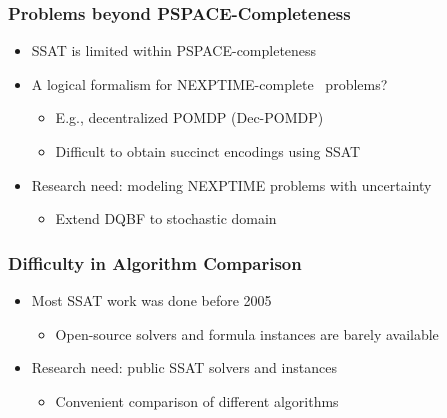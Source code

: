 \begin{frame}
      \frametitle{Problems beyond PSPACE-Completeness}
      \begin{itemize}
            \item SSAT is limited within PSPACE-completeness
                  \pause
            \item A logical formalism for NEXPTIME-complete~\cite{Peterson1979} problems?
                  \begin{itemize}
                        \item E.g., decentralized POMDP (Dec-POMDP)~\cite{Bernstein2002}
                        \item Difficult to obtain succinct encodings using SSAT
                  \end{itemize}
                  \pause
            \item \alert{Research need: modeling NEXPTIME problems with uncertainty}
                  \begin{itemize}
                        \item Extend DQBF to stochastic domain
                  \end{itemize}
      \end{itemize}
\end{frame}

\begin{frame}
      \frametitle{Difficulty in Algorithm Comparison}
      \begin{itemize}
            \item Most SSAT work was done before 2005~\cite{Majercik1998,Majercik2003,Majercik2004,Majercik2005}
                  \begin{itemize}
                        \item Open-source solvers and formula instances are barely available
                  \end{itemize}
                  \pause
            \item \alert{Research need: public SSAT solvers and instances}
                  \begin{itemize}
                        \item Convenient comparison of different algorithms
                  \end{itemize}
      \end{itemize}
\end{frame}
